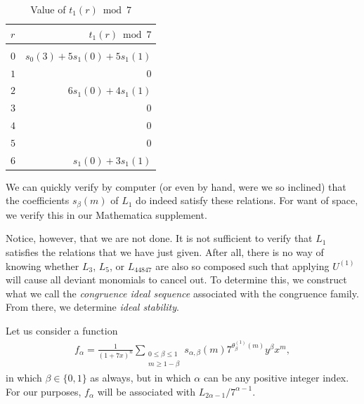 \documentclass[reqno]{amsart}
\theoremstyle{definition}
\theoremstyle{remark}
\numberwithin{equation}{section}
\begin{document}
\begin{table}[hbt!]
\begin{center}
\begin{tabular}{l|r}
 $r$      & $t_1(r)\bmod 7$\\
\hline\\
 $0$         & $s_0(3)+5s_1(0)+5s_1(1)$\\
 $1$         & $0$\\
 $2$         & $6s_1(0)+4s_1(1)$\\
 $3$         & $0$\\
 $4$         & $0$\\
 $5$         & $0$\\
 $6$         & $s_1(0)+3s_1(1)$
 \end{tabular}
\vspace{0.2 cm}
\caption{Value of $t_1(r)\bmod 7$}\label{tablew1}
\end{center}
\end{table}

We can quickly verify by computer (or even by hand, were we so inclined) that the coefficients $s_{\beta}(m)$ of $L_1$ do indeed satisfy these relations.  For want of space, we verify this in our Mathematica supplement.

Notice, however, that we are not done.  It is not sufficient to verify that $L_1$ satisfies the relations that we have just given.  After all, there is no way of knowing whether $L_3$, $L_5$, or $L_{44847}$ are also so composed such that applying $U^{(1)}$ will cause all deviant monomials to cancel out.  To determine this, we construct what we call the \textit{congruence ideal sequence} associated with the congruence family.  From there, we determine \textit{ideal stability}.

Let us consider a function
\begin{align}
f_{\alpha}=\frac{1}{(1+7x)^n}\sum_{\substack{0\le\beta\le 1\\ m\ge 1-\beta}}s_{\alpha,\beta}(m)7^{\theta^{(1)}_{\beta}(m)}y^{\beta}x^m,\label{falpha}
\end{align} in which $\beta\in\{0,1\}$ as always, but in which $\alpha$ can be any positive integer index.  For our purposes, $f_{\alpha}$ will be associated with $L_{2\alpha-1}/7^{\alpha -1}$.  
\end{document}
